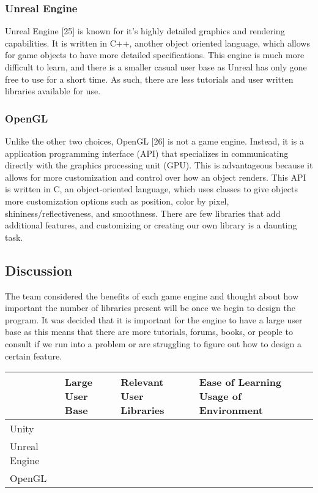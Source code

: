 \documentclass[letterpaper,10pt,onecolumn,compsoc]{IEEEtran}
\begin{document}
\subsubsection{Unreal Engine}
Unreal Engine [25] is known for it’s highly detailed graphics and rendering capabilities. It is written in C++, another object oriented language, which allows for game objects to have more detailed specifications. This engine is much more difficult to learn, and there is a smaller casual user base as Unreal has only gone free to use for a short time. As such, there are less tutorials and user written libraries available for use.

\subsubsection{OpenGL}
Unlike the other two choices, OpenGL [26] is not a game engine. Instead, it is a application programming interface (API) that specializes in communicating directly with the graphics processing unit (GPU). This is advantageous because it allows for more customization and control over how an object renders. This API is written in C, an object-oriented language, which uses classes to give objects more customization options such as position, color by pixel, shininess/reflectiveness, and smoothness. There are few libraries that add additional features, and customizing or creating our own library is a daunting task.

\subsection{Discussion}
The team considered the benefits of each game engine and thought about how important the number of libraries present will be once we begin to design the program. It was decided that it is important for the engine to have a large user base as this means that there are more tutorials, forums, books, or people to consult if we run into a problem or are struggling to figure out how to design a certain feature.


\begin{center}
\begin{tabular}{ | P{3cm} | P{2.5cm} | P{3.5cm} | P{6cm} | } 
 	\hline
 	 & Large User Base & Relevant User Libraries & Ease of Learning Usage of Environment \\ 
 	\hline
 	Unity & \checkmark & \checkmark & \checkmark \\ 
 	\hline
 	Unreal Engine & \checkmark & \checkmark &  \\ 
 	\hline
 	OpenGL & \checkmark & \checkmark & \\ 
 	\hline
\end{tabular}
\end{center}
\end{document}

